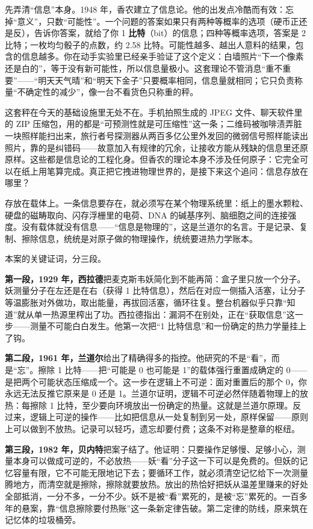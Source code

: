 先弄清“信息”本身。1948 年，香农建立了信息论。他的出发点冷酷而有效：忘掉“意义”，只数“可能性”。一个问题的答案如果只有两种等概率的选项（硬币正还是反），告诉你答案，就给了你 1 \textbf{比特}（bit）的信息；四种等概率选项，答案是 2 比特；一枚均匀骰子的点数，约 2.58 比特。可能性越多、越出人意料的结果，包含的信息越多。你在动手实验里已经亲手验证了这个定义：白墙照片“下一个像素还是白的”，等于没有新可能性，所以信息量极小。这套理论不管消息“重不重要”——“明天天气晴”和“明天下金子”只要概率相同，信息量就相同；它只负责称量“不确定性的减少”，像一台不看货色只称重的秤。

这套秤在今天的基础设施里无处不在。手机拍照生成的 JPEG 文件、聊天软件里的 ZIP 压缩包，用的都是“可预测性就是可压缩性”这一条；二维码被咖啡渍弄脏一块照样能扫出来，旅行者号探测器从两百多亿公里外发回的微弱信号照样能读出照片，靠的是纠错码——故意加入有规律的冗余，让接收方能从残缺的信息里还原原样。这些都是信息论的工程化身。但香农的理论本身不涉及任何原子：它完全可以在纸上用笔算完成。真正把它拽进物理世界的，是接下来这个追问：信息存放在哪里？

存放在载体上。一条信息要存在，就必须写在某个物理系统里：纸上的墨水颗粒、硬盘的磁畴取向、闪存浮栅里的电荷、DNA 的碱基序列、脑细胞之间的连接强度。没有载体就没有信息——“信息是物理的”，这是兰道尔的名言。于是记录、复制、擦除信息，统统是对原子做的物理操作，统统要进热力学账本。

本案的关键证词，分三段。

\textbf{第一段，1929 年，西拉德}把麦克斯韦妖简化到不能再简：盒子里只放一个分子。妖测量分子在左还是在右（获得 1 比特信息），然后在对应一侧插入活塞，让分子等温膨胀对外做功，取出能量，再拔回活塞，循环往复。整台机器似乎只靠“知道”就从单一热源里榨出了功。西拉德指出：漏洞不在别处，正在“获取信息”这一步——测量不可能白白发生。他第一次把“1 比特信息”和一份确定的热力学量挂上了钩。

\textbf{第二段，1961 年，兰道尔}给出了精确得多的指控。他研究的不是“看”，而是“忘”。擦除 1 比特——把“可能是 0 也可能是 1”的载体强行重置成确定的 0——是把两个可能状态压缩成一个。这一步在逻辑上不可逆：面对重置后的那个 0，你永远无法反推它原来是 0 还是 1。兰道尔证明，逻辑不可逆必然伴随着物理上的放热：每擦除 1 比特，至少要向环境放出一份确定的热量。这就是兰道尔原理。反过来，逻辑上可逆的操作——比如把信息从一处复制到另一处，原样保留——原则上可以做到不放热。记录可以轻巧，遗忘却要付费；这条不对称是整章的枢纽。

\textbf{第三段，1982 年，贝内特}把案子结了。他证明：只要操作足够慢、足够小心，测量本身可以做成可逆的，不必放热——妖“看”分子这一下可以是免费的。但妖的记忆容量有限，它不可能无限地记下去；要循环工作，就必须清空记忆给下一次测量腾地方，而清空就是擦除，擦除就要放热。放出的热恰好把妖从温差里赚来的好处全部抵消，一分不多，一分不少。妖不是被“看”累死的，是被“忘”累死的。一百多年的悬案，靠“信息擦除要付热账”这一条新定律告破。第二定律的防线，原来筑在记忆体的垃圾桶旁。


